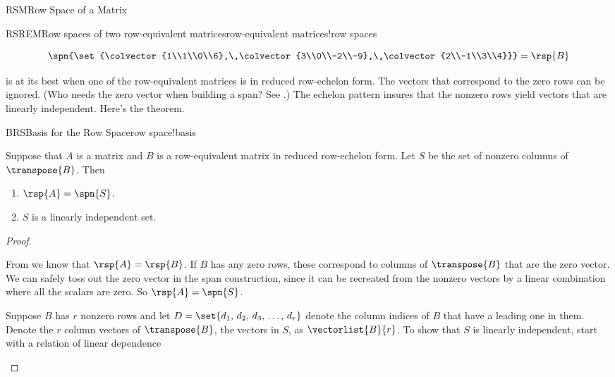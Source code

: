 \begin{subsect}{RSM}{Row Space of a Matrix}
\begin{example}{RSREM}{Row spaces of two row-equivalent matrices}{row-equivalent matrices!row spaces}
\begin{para}
\begin{equation*}
\spn{\set{\colvector{1\\1\\0\\6},\,\colvector{3\\0\\-2\\-9},\,\colvector{2\\-1\\3\\4}}}
=\rsp{B}
\end{equation*}\end{para}
%
\end{example}
%
\begin{para} is at its best when one of the row-equivalent matrices is in reduced row-echelon form.  The vectors that correspond to the zero rows can be ignored. (Who needs the zero vector when building a span? See .)  The echelon pattern insures that the nonzero rows yield vectors that are linearly independent.  Here's the theorem.\end{para}
%
\begin{theorem}{BRS}{Basis for the Row Space}{row space!basis}
\begin{para}Suppose that $A$ is a matrix and $B$ is a row-equivalent matrix in reduced row-echelon form.  Let $S$ be the set of nonzero columns of $\transpose{B}$.  Then
%
\begin{enumerate}
\item $\rsp{A}=\spn{S}$.
\item $S$ is a linearly independent set.
\end{enumerate}
\end{para}
%
\end{theorem}
%
\begin{proof}
\begin{para}From  we know that $\rsp{A}=\rsp{B}$.  If $B$ has any zero rows, these correspond to columns of $\transpose{B}$ that are the zero vector.  We can safely toss out the zero vector in the span construction, since it can be recreated from the nonzero vectors by a linear combination where all the scalars are zero.  So $\rsp{A}=\spn{S}$.\end{para}
%
\begin{para}Suppose $B$ has $r$ nonzero rows and let $D=\set{d_1,\,d_2,\,d_3,\,\ldots,\,d_r}$ denote the column indices of $B$ that have a leading one in them.  Denote the $r$ column vectors of $\transpose{B}$, the vectors in $S$, as $\vectorlist{B}{r}$.  To show that $S$ is linearly independent, start with a relation of linear dependence

\end{para}
\end{proof}
\end{subsect}
